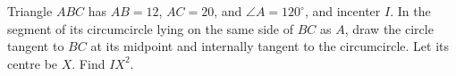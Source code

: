 Triangle $ABC$ has $AB=12$, $AC=20$, and $\angle A=120^\circ$, and incenter $I$. In the segment of its circumcircle lying on the same side of $BC$ as $A$, draw the circle tangent to $BC$ at its midpoint and internally tangent to the circumcircle. Let its centre be $X$. Find $IX^2$.
